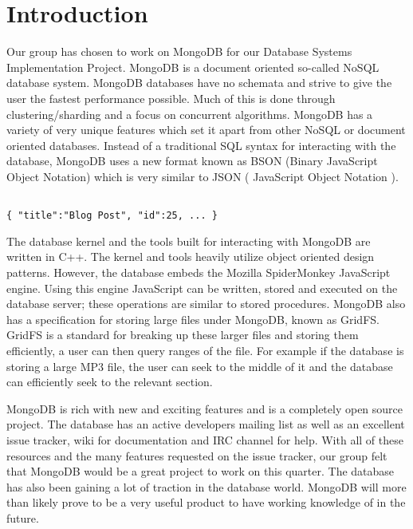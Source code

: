 \documentclass{dependencies/acm_proc_article-sp}
\begin{document}
%

\section{Introduction}
Our group has chosen to work on MongoDB for our Database Systems
Implementation Project. MongoDB is a document oriented so-called NoSQL
database system. MongoDB databases have no schemata and strive to give the user
the fastest performance possible. Much of this is done through clustering/sharding
and a focus on concurrent algorithms. MongoDB has a variety of very unique
features which set it apart from other NoSQL or document oriented databases.
Instead of a traditional SQL syntax for interacting with the database, MongoDB uses
a new format known as BSON (Binary JavaScript Object Notation) which is very similar
to JSON ( JavaScript Object Notation ).
\begin{lstlisting}

{ "title":"Blog Post", "id":25, ... }
\end{lstlisting}
The database kernel and the tools built for interacting with MongoDB are written in
C++. The kernel and tools heavily utilize object oriented design patterns.
However, the database embeds the Mozilla SpiderMonkey JavaScript engine.
Using this engine JavaScript can be written, stored and executed on the database server; these
operations are similar to stored procedures. MongoDB also has a specification for storing
large files under MongoDB, known as GridFS. GridFS is a standard for breaking up these larger
files and storing them efficiently, a user can then query ranges of the file. For example if the
database is storing a large MP3 file, the user can seek to the middle of it and the database can
efficiently seek to the relevant section.

MongoDB is rich with new and exciting features and is a completely open source project.
The database has an active developers mailing list as well as an excellent issue tracker,
wiki for documentation and IRC channel for help. With all of these resources and
the many features requested on the issue tracker, our group felt that MongoDB would be a great
project to work on this quarter. The database has also been gaining a lot of traction in the
database world. MongoDB will more than likely prove to be a very useful product
to have working knowledge of in the future.
\end{document}
